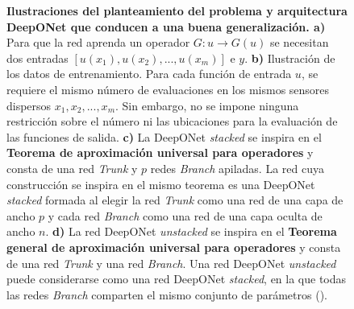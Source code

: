 \documentclass[
  spanish,
  us-letterpaper,
  DIV=11,
  numbers=noendperiod]{scrreprt}
\theoremstyle{plain}
\theoremstyle{definition}
\theoremstyle{remark}
\begin{document}
\begin{figure}


\caption{\label{fig-deeponet-arch}\textbf{Ilustraciones del
planteamiento del problema y arquitectura DeepONet que conducen a una
buena generalización. a)} Para que la red aprenda un operador
\(G : u \rightarrow G(u)\) se necesitan dos entradas
\([u(x_1), u(x_2), ..., u(x_m)]\) e \(y\). \textbf{b)} Ilustración de
los datos de entrenamiento. Para cada función de entrada \(u\), se
requiere el mismo número de evaluaciones en los mismos sensores
dispersos \(x_1, x_2, ..., x_m\). Sin embargo, no se impone ninguna
restricción sobre el número ni las ubicaciones para la evaluación de las
funciones de salida. \textbf{c)} La DeepONet \emph{stacked} se inspira
en el \textbf{Teorema de aproximación universal para operadores} y
consta de una red \emph{Trunk} y \(p\) redes \emph{Branch} apiladas. La
red cuya construcción se inspira en el mismo teorema es una DeepONet
\emph{stacked} formada al elegir la red \emph{Trunk} como una red de una
capa de ancho \(p\) y cada red \emph{Branch} como una red de una capa
oculta de ancho \(n\). \textbf{d)} La red DeepONet \emph{unstacked} se
inspira en el \textbf{Teorema general de aproximación universal para
operadores} y consta de una red \emph{Trunk} y una red \emph{Branch}.
Una red DeepONet \emph{unstacked} puede considerarse como una red
DeepONet \emph{stacked}, en la que todas las redes \emph{Branch}
comparten el mismo conjunto de parámetros
().}

\end{figure}%
\end{document}
